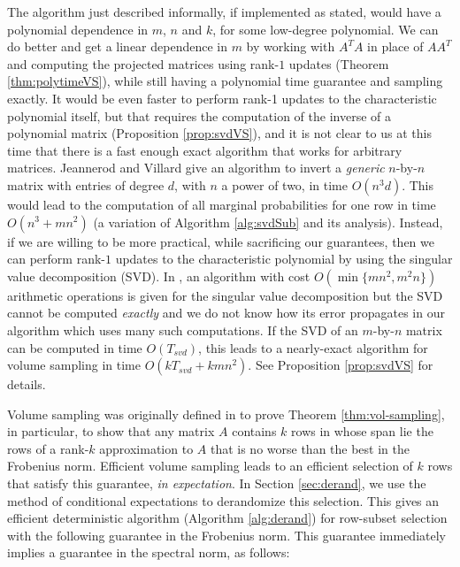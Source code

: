 \documentclass[11pt]{article}
\begin{document}
The algorithm just described informally, if implemented as stated, would have a polynomial dependence in $m$, $n$ and $k$, for some low-degree polynomial. We can do better and get a linear dependence in $m$ by working with $A^{T}A$ in place of $AA^{T}$ and computing the projected matrices using rank-$1$ updates (Theorem \ref{thm:polytimeVS}), while still having a polynomial time guarantee and sampling exactly. It would be even faster to perform rank-1 updates to the characteristic polynomial itself, but that requires the computation of the inverse of a polynomial matrix (Proposition \ref{prop:svdVS}), and it is not clear to us at this time that there is a fast enough exact algorithm that works for arbitrary matrices. Jeannerod and Villard \cite{JV} give an algorithm to invert a \emph{generic} $n$-by-$n$ matrix with entries of degree $d$, with $n$ a power of two, in time $O(n^3 d)$. This would lead to the computation of all marginal probabilities for one row in time $O(n^3 + mn^2)$ (a variation of Algorithm \ref{alg:svdSub} and its analysis). 
Instead, if we are willing to be more practical, while sacrificing our guarantees, then we can perform rank-$1$ updates to the characteristic polynomial by using the singular value decomposition (SVD). In \cite{GVL}, an algorithm with cost $O(\min\{mn^{2}, m^{2}n\})$ arithmetic operations is given for the singular value decomposition but the SVD cannot be computed \emph{exactly} and we do not know how its error propagates in our algorithm which uses many such computations. If the SVD of an $m$-by-$n$ matrix can be computed in time $O(T_{svd})$, this leads to a nearly-exact algorithm for volume sampling in time $O(k T_{svd} + kmn^{2})$. See Proposition \ref{prop:svdVS} for details.

Volume sampling was originally defined in \cite{DRVW} to prove Theorem \ref{thm:vol-sampling}, in particular, to show that any matrix $A$ contains $k$ rows in whose span lie the rows of a rank-$k$ approximation to $A$ that is no worse than the best in the Frobenius norm. Efficient volume sampling leads to an efficient selection of $k$ rows that satisfy this guarantee, \emph{in expectation}. In Section \ref{sec:derand}, we use the method of conditional expectations to derandomize this selection. This gives an efficient deterministic algorithm (Algorithm \ref{alg:derand}) for row-subset selection with the following guarantee in the Frobenius norm. This guarantee immediately implies a guarantee in the spectral norm, as follows:
\end{document}
